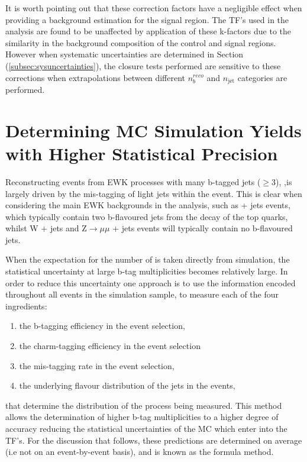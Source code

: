 It is worth pointing out that these correction factors have a negligible effect when providing a background estimation for the signal region. The \ac{TF}'s used in the analysis are found to be unaffected by application of these k-factors due to the similarity in the background composition of the control and signal regions. However when systematic uncertainties are determined in Section (\ref{subsec:sysuncertainties}), the closure tests performed are sensitive to these corrections when extrapolations between different $n_{b}^{reco}$ and $n_{\text{jet}}$ categories are performed.


\section{Determining MC Simulation Yields with Higher Statistical Precision}
\label{subsec:backgroundestimation}

Reconstructing events from \ac{EWK} processes with many b-tagged jets ($\geq$3), \nbreco  ,is largely driven by the mis-tagging of light jets within the event. This is clear when considering the main \ac{EWK} backgrounds in the analysis, such as \ttbar + jets events, which typically contain two b-flavoured jets from the decay of the top quarks, whilst W + jets and Z$\rightarrow \mu\mu$ + jets events will typically contain no b-flavoured jets.

When the expectation for the number of \nbreco is taken directly from simulation, the statistical uncertainty at large b-tag multiplicities becomes relatively large. In order to reduce this uncertainty one approach is to use the information encoded throughout all events in the simulation sample, to measure each of the four ingredients:

\begin{enumerate}
\item the b-tagging efficiency in the event selection,
\item the charm-tagging efficiency in the event selection
\item the mis-tagging rate in the event selection,
\item the underlying flavour distribution of the jets in the events,
\end{enumerate}

 that determine the \nbreco distribution of the process being measured. This method allows the determination of higher b-tag multiplicities to a higher degree of accuracy reducing the statistical uncertainties of the MC which enter into the \ac{TF}'s. For the discussion that follows, these predictions are determined on average (i.e not on an event-by-event basis), and is known as the formula method.

